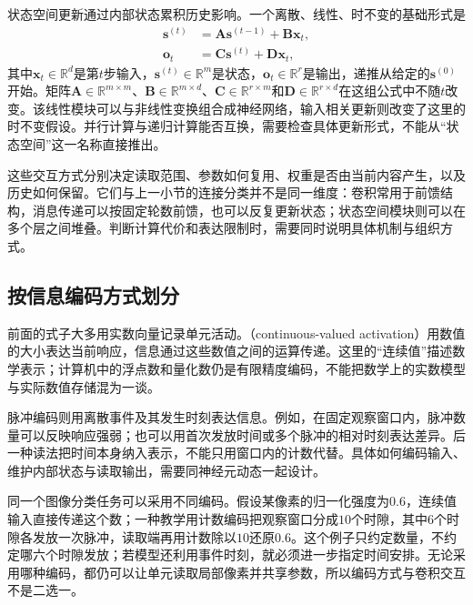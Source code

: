 状态空间更新通过内部状态累积历史影响。一个离散、线性、时不变的基础形式是
\begin{equation}
  \begin{aligned}
    \bm{s}^{(t)}&=\bm{A}\bm{s}^{(t-1)}+\bm{B}\bm{x}_t,\\
    \bm{o}_t&=\bm{C}\bm{s}^{(t)}+\bm{D}\bm{x}_t,
  \end{aligned}
  \label{eq:neural-basic-state-space}
\end{equation}
其中$\bm{x}_t\in\mathbb{R}^{d}$是第$t$步输入，$\bm{s}^{(t)}\in\mathbb{R}^{m}$是状态，$\bm{o}_t\in\mathbb{R}^{r}$是输出，递推从给定的$\bm{s}^{(0)}$开始。矩阵$\bm{A}\in\mathbb{R}^{m\times m}$、$\bm{B}\in\mathbb{R}^{m\times d}$、$\bm{C}\in\mathbb{R}^{r\times m}$和$\bm{D}\in\mathbb{R}^{r\times d}$在这组公式中不随$t$改变。该线性模块可以与非线性变换组合成神经网络，输入相关更新则改变了这里的时不变假设。并行计算与递归计算能否互换，需要检查具体更新形式，不能从“状态空间”这一名称直接推出。

这些交互方式分别决定读取范围、参数如何复用、权重是否由当前内容产生，以及历史如何保留。它们与上一小节的连接分类并不是同一维度：卷积常用于前馈结构，消息传递可以按固定轮数前馈，也可以反复更新状态；状态空间模块则可以在多个层之间堆叠。判断计算代价和表达限制时，需要同时说明具体机制与组织方式。

\subsection{按信息编码方式划分}
\label{sec:neural-types-encoding}

前面的式子大多用实数向量记录单元活动。（continuous-valued activation）用数值的大小表达当前响应，信息通过这些数值之间的运算传递。这里的“连续值”描述数学表示；计算机中的浮点数和量化数仍是有限精度编码，不能把数学上的实数模型与实际数值存储混为一谈。

脉冲编码则用离散事件及其发生时刻表达信息。例如，在固定观察窗口内，脉冲数量可以反映响应强弱；也可以用首次发放时间或多个脉冲的相对时刻表达差异。后一种读法把时间本身纳入表示，不能只用窗口内的计数代替。具体如何编码输入、维护内部状态与读取输出，需要同神经元动态一起设计。

同一个图像分类任务可以采用不同编码。假设某像素的归一化强度为$0.6$，连续值输入直接传递这个数；一种教学用计数编码把观察窗口分成$10$个时隙，其中$6$个时隙各发放一次脉冲，读取端再用计数除以$10$还原$0.6$。这个例子只约定数量，不约定哪六个时隙发放；若模型还利用事件时刻，就必须进一步指定时间安排。无论采用哪种编码，都仍可以让单元读取局部像素并共享参数，所以编码方式与卷积交互不是二选一。

